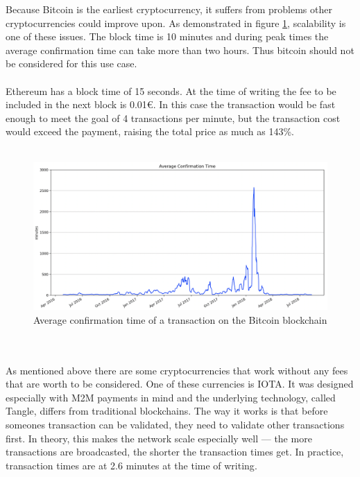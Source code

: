 Because Bitcoin is the earliest cryptocurrency, it suffers from problems other cryptocurrencies could improve upon. As demonstrated in figure \ref{fig:BitcoinConfirmationTime}, scalability is one of these issues. The block time is 10 minutes\cite{bitcoin-whitepaper} and during peak times the average confirmation time can take more than two hours. Thus bitcoin should not be considered for this use case.
\\\\
Ethereum has a block time of 15 seconds. At the time of writing the fee to be included in the next block is 0.01\euro\cite{ethereum-fee}. In this case the transaction would be fast enough to meet the goal of 4 transactions per minute, but the transaction cost would exceed the payment, raising the total price as much as 143\%.
\\\\
\begin{figure}[H]
    \includegraphics[width=\textwidth]{img/average-confirmation-time.png}
    \caption{Average confirmation time of a transaction on the Bitcoin blockchain\cite{btc-conf-time}}
    \label{fig:BitcoinConfirmationTime}
\end{figure}
\leavevmode
\\\\
As mentioned above there are some cryptocurrencies that work without any fees that are worth to be considered. One of these currencies is IOTA. It was designed especially with M2M payments in mind and the underlying technology, called Tangle, differs from traditional blockchains. The way it works is that before someones transaction can be validated, they need to validate other transactions first\cite{tangle}. In theory, this makes the network scale especially well — the more transactions are broadcasted, the shorter the transaction times get. In practice, transaction times are at 2.6 minutes at the time of writing\cite{iota-time}.
